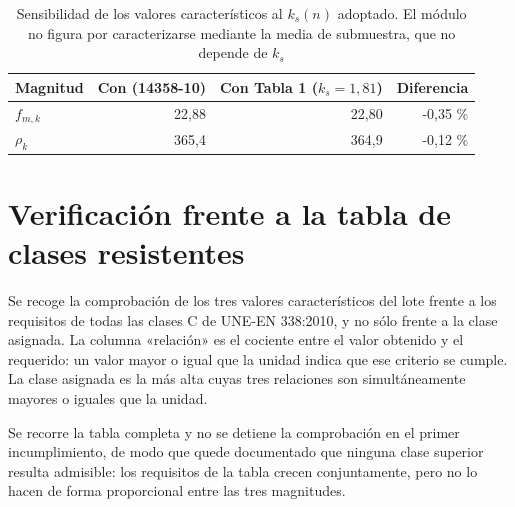 \documentclass[11pt,a4paper]{article}
\begin{document}
\begin{table}[H]
\centering
\caption[Sensibilidad de los valores característicos al $k_{s}(n)$ adoptado]{Sensibilidad de los valores característicos al $k_{s}(n)$ adoptado. El módulo no figura por caracterizarse mediante la media de submuestra, que no depende de $k_{s}$}
\begin{tabular}{l r r r}
\toprule
\textbf{Magnitud} & \textbf{Con (14358-10)} & \textbf{Con Tabla 1 ($k_{s} = 1{,}81$)} & \textbf{Diferencia} \\
\midrule
$f_{m,k}$ & 22,88 & 22,80 & -0,35 \% \\
$\rho_{k}$ & 365,4 & 364,9 & -0,12 \% \\
\bottomrule
\end{tabular}
\end{table}

\section{Verificación frente a la tabla de clases resistentes}
\label{anx:clases}

Se recoge la comprobación de los tres valores característicos del lote frente a los
requisitos de todas las clases C de UNE-EN 338:2010, y no sólo frente a la clase
asignada. La columna «relación» es el cociente entre el valor obtenido y el requerido:
un valor mayor o igual que la unidad indica que ese criterio se cumple. La clase
asignada es la más alta cuyas tres relaciones son simultáneamente mayores o iguales que
la unidad.

Se recorre la tabla completa y no se detiene la comprobación en el primer
incumplimiento, de modo que quede documentado que ninguna clase superior resulta
admisible: los requisitos de la tabla crecen conjuntamente, pero no lo hacen de forma
proporcional entre las tres magnitudes.
\end{document}
